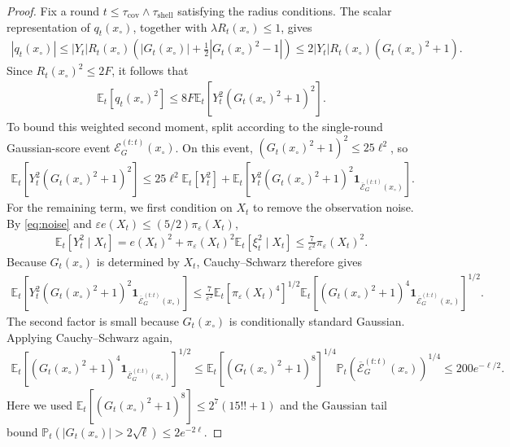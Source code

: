 \documentclass{article}
\newcommand{\E}{\mathbb E}
\newcommand{\Pp}{\mathbb P}
\newcommand{\1}{\mathbf 1}
\newcommand{\eps}{\varepsilon}
\begin{document}
\begin{proof}
    Fix a round $t\leq\tau_{\mathrm{cov}}\wedge\tau_{\mathrm{shell}}$
    satisfying the radius conditions. The scalar representation of
    $q_t(x_{\circ})$, together with $\lambda R_t(x_{\circ})\leq1$, gives
    \begin{align}
        |q_t(x_{\circ})|
        \leq|Y_t|R_t(x_{\circ})
        \left(|G_t(x_{\circ})|+\frac12|G_t(x_{\circ})^2-1|\right)
        \leq2|Y_t|R_t(x_{\circ})(G_t(x_{\circ})^2+1).
    \end{align}
    Since $R_t(x_{\circ})^2\leq2F$, it follows that
    \begin{align}
        \E_t[q_t(x_{\circ})^2]
        \leq8F\E_t[Y_t^2(G_t(x_{\circ})^2+1)^2].
    \end{align}
    To bound this weighted second moment, split according to the
    single-round Gaussian-score event $\mathcal E_G^{(t:t)}(x_{\circ})$.
    On this event, $(G_t(x_{\circ})^2+1)^2\leq25\ell^2$, so
    \begin{align}
        \E_t[Y_t^2(G_t(x_{\circ})^2+1)^2]
        \leq25\ell^2\E_t[Y_t^2]
        +\E_t\left[Y_t^2(G_t(x_{\circ})^2+1)^2
        \1_{\overline{\mathcal E}_G^{(t:t)}(x_{\circ})}\right].
    \end{align}
    For the remaining term, we first condition on $X_t$ to remove the
    observation noise. By \eqref{eq:noise} and
    $\eps e(X_t)\leq(5/2)\pi_\eps(X_t)$,
    \begin{align}
        \E_t[Y_t^2\mid X_t]
        =e(X_t)^2+\pi_\eps(X_t)^2\E_t[\xi_t^2\mid X_t]
        \leq\frac7{\eps^2}\pi_\eps(X_t)^2.
    \end{align}
    Because $G_t(x_{\circ})$ is determined by $X_t$, Cauchy--Schwarz
    therefore gives
    \begin{align}
        \E_t\left[Y_t^2(G_t(x_{\circ})^2+1)^2
        \1_{\overline{\mathcal E}_G^{(t:t)}(x_{\circ})}\right]
        \leq\frac7{\eps^2}
        \E_t[\pi_\eps(X_t)^4]^{1/2}
        \E_t\left[(G_t(x_{\circ})^2+1)^4
        \1_{\overline{\mathcal E}_G^{(t:t)}(x_{\circ})}\right]^{1/2}.
    \end{align}
    The second factor is small because $G_t(x_{\circ})$ is conditionally
    standard Gaussian. Applying Cauchy--Schwarz again,
    \begin{align}
        \E_t\left[(G_t(x_{\circ})^2+1)^4
        \1_{\overline{\mathcal E}_G^{(t:t)}(x_{\circ})}\right]^{1/2}
        \leq\E_t[(G_t(x_{\circ})^2+1)^8]^{1/4}
        \Pp_t\left(\overline{\mathcal E}_G^{(t:t)}(x_{\circ})\right)^{1/4}
        \leq200e^{-\ell/2}.
    \end{align}
    Here we used
    $\E_t[(G_t(x_{\circ})^2+1)^8]\leq2^7(15!!+1)$ and the Gaussian tail
    bound $\Pp_t(|G_t(x_{\circ})|>2\sqrt\ell)\leq2e^{-2\ell}$.


\end{proof}
\end{document}
